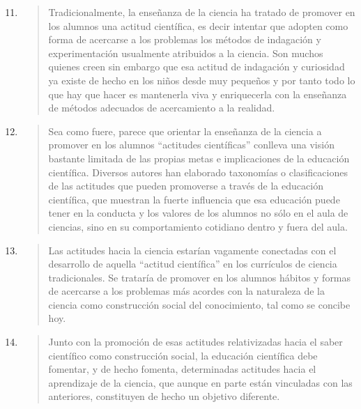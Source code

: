 \documentclass{article}
\begin{document}
\begin{enumerate}
  \setcounter{enumi}{10}

  \item \begin{quote}
  Tradicionalmente, la enseñanza de la ciencia ha tratado de promover en los alumnos una actitud científica, es decir intentar que adopten como forma de acercarse a los problemas los métodos de indagación y experimentación usualmente atribuidos a la ciencia. Son muchos quienes creen sin embargo que esa actitud de indagación y curiosidad ya existe de hecho en los niños desde muy pequeños y por tanto todo lo que hay que hacer es mantenerla viva y enriquecerla con la enseñanza de métodos adecuados de acercamiento a la realidad.
  \end{quote}

  \item \begin{quote}
  Sea como fuere, parece que orientar la enseñanza de la ciencia a promover en los alumnos “actitudes científicas” conlleva una visión bastante limitada de las propias metas e implicaciones de la educación científica. Diversos autores han elaborado taxonomías o clasificaciones de las actitudes que pueden promoverse a través de la educación científica, que muestran la fuerte influencia que esa educación puede tener en la conducta y los valores de los alumnos no sólo en el aula de ciencias, sino en su comportamiento cotidiano dentro y fuera del aula.
  \end{quote}

  \item \begin{quote}
  Las actitudes hacia la ciencia estarían vagamente conectadas con el desarrollo de aquella “actitud científica” en los currículos de ciencia tradicionales. Se trataría de promover en los alumnos hábitos y formas de acercarse a los problemas más acordes con la naturaleza de la ciencia como construcción social del conocimiento, tal como se concibe hoy.
  \end{quote}

  \item \begin{quote}
  Junto con la promoción de esas actitudes relativizadas hacia el saber científico como construcción social, la educación científica debe fomentar, y de hecho fomenta, determinadas actitudes hacia el aprendizaje de la ciencia, que aunque en parte están vinculadas con las anteriores, constituyen de hecho un objetivo diferente. 
  \end{quote}


\end{enumerate}
\end{document}
